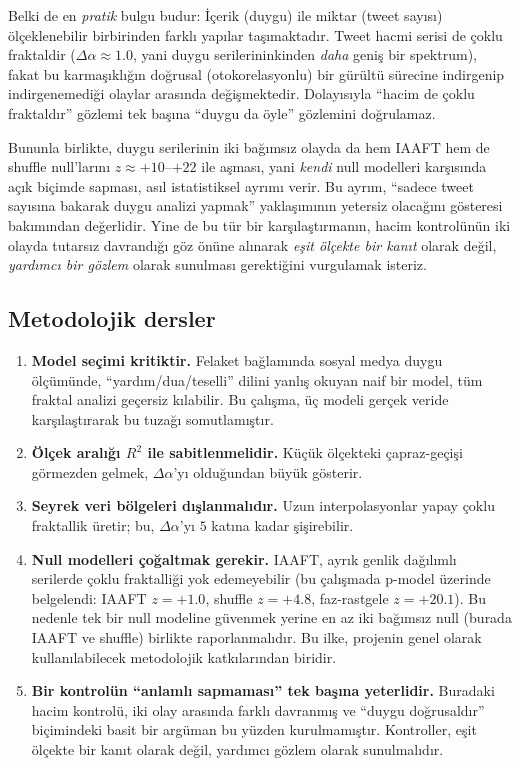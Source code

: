 \documentclass[11pt,a4paper]{article}
\newcommand{\Dal}{\Delta\alpha}
\begin{document}
Belki de en \emph{pratik} bulgu budur: İçerik (duygu) ile miktar (tweet
sayısı) ölçeklenebilir birbirinden farklı yapılar taşımaktadır. Tweet hacmi
serisi de çoklu fraktaldir ($\Delta\alpha\approx 1.0$, yani duygu
serilerininkinden \emph{daha} geniş bir spektrum), fakat bu karmaşıklığın
doğrusal (otokorelasyonlu) bir gürültü sürecine indirgenip indirgenemediği
olaylar arasında değişmektedir. Dolayısıyla ``hacim de çoklu fraktaldır''
gözlemi tek başına ``duygu da öyle'' gözlemini doğrulamaz.

Bununla birlikte, duygu serilerinin iki bağımsız olayda da hem IAAFT hem de
shuffle null'larını $z\approx +10$--$+22$ ile aşması, yani \emph{kendi}
null modelleri karşısında açık biçimde sapması, asıl istatistiksel ayrımı
verir. Bu ayrım, ``sadece tweet sayısına bakarak duygu analizi yapmak''
yaklaşımının yetersiz olacağını gösteresi bakımından değerlidir. Yine de
bu tür bir karşılaştırmanın, hacim kontrolünün iki olayda tutarsız davrandığı
göz önüne alınarak \emph{eşit ölçekte bir kanıt} olarak değil, \emph{yardımcı
bir gözlem} olarak sunulması gerektiğini vurgulamak isteriz.

\subsection{Metodolojik dersler}

\begin{enumerate}[leftmargin=1.6em]
  \item \textbf{Model seçimi kritiktir.} Felaket bağlamında sosyal medya
        duygu ölçümünde, ``yardım/dua/teselli'' dilini yanlış okuyan naif bir
        model, tüm fraktal analizi geçersiz kılabilir. Bu çalışma, üç modeli
        gerçek veride karşılaştırarak bu tuzağı somutlamıştır.
  \item \textbf{Ölçek aralığı $R^2$ ile sabitlenmelidir.} Küçük ölçekteki
        çapraz-geçişi görmezden gelmek, $\Dal$'yı olduğundan büyük gösterir.
  \item \textbf{Seyrek veri bölgeleri dışlanmalıdır.} Uzun interpolasyonlar
        yapay çoklu fraktallik üretir; bu, $\Dal$'yı $5$ katına kadar
        şişirebilir.
  \item \textbf{Null modelleri çoğaltmak gerekir.} IAAFT, ayrık genlik
        dağılımlı serilerde çoklu fraktalliği yok edemeyebilir (bu çalışmada
        p-model üzerinde belgelendi: IAAFT $z=+1.0$, shuffle $z=+4.8$,
        faz-rastgele $z=+20.1$). Bu nedenle tek bir null modeline güvenmek
        yerine en az iki bağımsız null (burada IAAFT ve shuffle) birlikte
        raporlanmalıdır. Bu ilke, projenin genel olarak kullanılabilecek
        metodolojik katkılarından biridir.
  \item \textbf{Bir kontrolün ``anlamlı sapmaması'' tek başına yeterlidir.}
        Buradaki hacim kontrolü, iki olay arasında farklı davranmış ve
        ``duygu doğrusaldır'' biçimindeki basit bir argüman bu yüzden
        kurulmamıştır. Kontroller, eşit ölçekte bir kanıt olarak değil,
        yardımcı gözlem olarak sunulmalıdır.
\end{enumerate}
\end{document}
